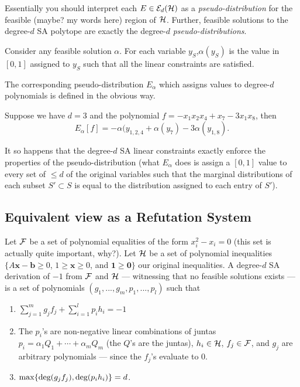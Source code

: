 Essentially you should interpret each $E \in \mathcal{E}_d(\mathcal{H})$ as a \emph{pseudo-distribution} for the feasible (maybe? my words here) region of $\mathcal{H}$. Further, feasible solutions to the degree-$d$ SA polytope are exactly the degree-$d$ \emph{pseudo-distributions}.

Consider any feasible solution $\alpha$. For each variable $y_S$,$\alpha(y_S)$ is the value in $[0,1]$ assigned to $y_S$ such that all the linear constraints are satisfied.

The corresponding pseudo-distribution $E_{\alpha}$ which assigns values to degree-$d$ polynomials is defined in the obvious way.
\begin{example}
Suppose we have $d = 3$ and the polynomial $f = -x_1x_2x_4 + x_7 - 3x_1x_8$, then
\[E_{\alpha}[f] = -\alpha(y_{1,2,4} + \alpha(y_{7}) -3\alpha(y_{1,8}).\]
\end{example}
It so happens that the degree-$d$ SA linear constraints exactly enforce the properties of the pseudo-distribution (what $E_{\alpha}$ does is assign a $[0,1]$ value to every set of $\leq d$ of the original variables such that the marginal distributions of each subset $S' \subset S$ is equal to the distribution assigned to each entry of $S'$). 

\subsection{Equivalent view as a Refutation System}
Let $\mathcal{F}$ be a set of polynomial equalities of the form $x_i^2 - x_i = 0$ (this set is actually quite important, why?). Let $\mathcal{H}$ be a set of polynomial inequalities $\{A\mathbf{x} - \mathbf{b} \geq 0$, $1 \geq \mathbf{x} \geq 0$, and $\mathbf{1} \geq \mathbf{0}\}$ our original inequalities. A degree-$d$ SA derivation of $-1$ from $\mathcal{F}$ and $\mathcal{H}$ --- witnessing that no feasible solutions exists --- is a set of polynomials $(g_1, ..., g_m, p_1, ..., p_l)$ such that
 
\begin{enumerate}
\item $\sum_{j=1}^{m} g_jf_j + \sum_{i = 1}^{l}p_ih_i = -1$
\item The $p_i$'s are non-negative linear combinations of juntas $p_i = \alpha_1Q_1 + \cdots + \alpha_mQ_m$ (the $Q$'s are the juntas), $h_i \in \mathcal{H}$, $f_j \in \mathcal{F}$, and $g_j$ are arbitrary polynomials --- since the $f_j$'s evaluate to 0. 
\item $\max\{\mbox{deg}(g_jf_j), \mbox{deg}(p_ih_i)\} = d$.
\end{enumerate}

